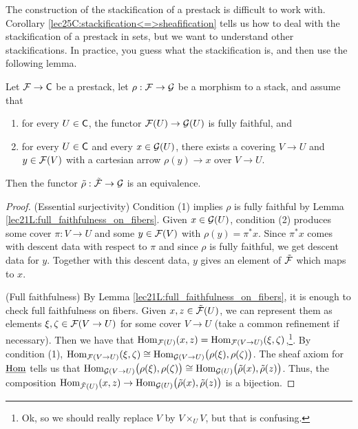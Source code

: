 
 The construction of the stackification of a prestack is difficult to work with.
 Corollary \ref{lec25C:stackification<=>sheafification} tells us how to deal with the
 stackification of a prestack in sets, but we want to understand other stackifications.
 In practice, you guess what the stackification is, and then use the following lemma.
 \begin{lemma} \label{lec26L:guess_stackification}
   Let $\mathcal{F}\to \text{\sf C}$ be a prestack, let $\rho:\mathcal{F}\to \mathcal{G}$ be a morphism to a stack, and
   assume that
   \begin{enumerate}
     \item for every $U\in \text{\sf C}$, the functor $\mathcal{F}(U)\to \mathcal{G}(U)$ is fully faithful, and
     \item for every $U\in \text{\sf C}$ and every $x\in \mathcal{G}(U)$, there exists a covering $V\to U$
     and $y\in \mathcal{F}(V)$ with a cartesian arrow $\rho (y)\to x$ over $V\to U$.
   \end{enumerate}
   Then the functor $\tilde \rho:\tilde {\mathcal{F}}\to \mathcal{G}$ is an equivalence.
 \end{lemma}
 \begin{proof}
   (Essential surjectivity) Condition (1) implies $\rho$ is fully faithful by Lemma
   \ref{lec21L:full_faithfulness_on_fibers}. Given $x\in \mathcal{G}(U)$, condition (2) produces
   some cover $\pi:V\to U$ and some $y\in \mathcal{F}(V)$ with $\rho(y)=\pi^* x$. Since $\pi^*x$
   comes with descent data with respect to $\pi$ and since $\rho$ is fully faithful, we
   get descent data for $y$. Together with this descent data, $y$ gives an element of
   $\tilde {\mathcal{F}}$ which maps to $x$.

   (Full faithfulness) By Lemma \ref{lec21L:full_faithfulness_on_fibers}, it is enough to
   check full faithfulness on fibers. Given $x,z\in \tilde {\mathcal{F}}(U)$, we can represent them
   as elements $\xi,\zeta\in \mathcal{F}(V\to U)$ for some cover $V\to U$ (take a common
   refinement if necessary). Then we have that $\operatorname{Hom}_{\mathcal{F}(U)}(x,z)=\operatorname{Hom}_{\mathcal{F}(V\to
   U)}(\xi,\zeta)$,\footnote{Ok, so we should really replace $V$ by $V\times_U V$, but
   that is confusing.}. By condition (1), $\operatorname{Hom}_{\mathcal{F}(V\to U)}(\xi,\zeta)\cong
   \operatorname{Hom}_{\mathcal{G}(V\to U)}\bigl(\rho(\xi),\rho(\zeta)\bigr)$. The sheaf axiom for $\operatorname{\underline{Hom}}$ tells
   us that $\operatorname{Hom}_{\mathcal{G}(V\to U)}\bigl(\rho(\xi),\rho(\zeta)\bigr)\cong
   \operatorname{Hom}_{\mathcal{G}(U)}\bigl(\tilde \rho (x),\tilde \rho (z)\bigr)$. Thus, the composition
   $\operatorname{Hom}_{\tilde{\mathcal{F}}(U)}(x,z)\to \operatorname{Hom}_{\mathcal{G}(U)}\bigl(\tilde \rho (x),\tilde\rho (z)\bigr)$ is
   a bijection.
 \end{proof}

